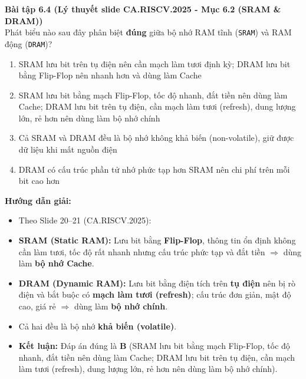 \textbf{Bài tập 6.4 (Lý thuyết slide CA.RISCV.2025 - Mục 6.2 (SRAM \& DRAM))}\\
Phát biểu nào sau đây phân biệt \textbf{đúng} giữa bộ nhớ RAM tĩnh (\texttt{SRAM}) và RAM động (\texttt{DRAM})?
\begin{enumerate}[label=\Alph*.]
    \item SRAM lưu bit trên tụ điện nên cần mạch làm tươi định kỳ; DRAM lưu bit bằng Flip-Flop nên nhanh hơn và dùng làm Cache
    \item SRAM lưu bit bằng mạch Flip-Flop, tốc độ nhanh, đắt tiền nên dùng làm Cache; DRAM lưu bit trên tụ điện, cần mạch làm tươi (refresh), dung lượng lớn, rẻ hơn nên dùng làm bộ nhớ chính
    \item Cả SRAM và DRAM đều là bộ nhớ không khả biến (non-volatile), giữ được dữ liệu khi mất nguồn điện
    \item DRAM có cấu trúc phần tử nhớ phức tạp hơn SRAM nên chi phí trên mỗi bit cao hơn
\end{enumerate}
\textbf{Hướng dẫn giải:}
\begin{itemize}
    \item Theo Slide 20--21 (CA.RISCV.2025):
    \item \textbf{SRAM (Static RAM):} Lưu bit bằng \textbf{Flip-Flop}, thông tin ổn định không cần làm tươi, tốc độ rất nhanh nhưng cấu trúc phức tạp và đắt tiền $\Rightarrow$ dùng làm \textbf{bộ nhớ Cache}.
    \item \textbf{DRAM (Dynamic RAM):} Lưu bit bằng điện tích trên \textbf{tụ điện} nên bị rò điện và bắt buộc có \textbf{mạch làm tươi (refresh)}; cấu trúc đơn giản, mật độ cao, giá rẻ $\Rightarrow$ dùng làm \textbf{bộ nhớ chính}.
    \item Cả hai đều là bộ nhớ \textbf{khả biến (volatile)}.
    \item \textbf{Kết luận:} Đáp án đúng là \textbf{B} (SRAM lưu bit bằng mạch Flip-Flop, tốc độ nhanh, đắt tiền nên dùng làm Cache; DRAM lưu bit trên tụ điện, cần mạch làm tươi (refresh), dung lượng lớn, rẻ hơn nên dùng làm bộ nhớ chính).
\end{itemize}

